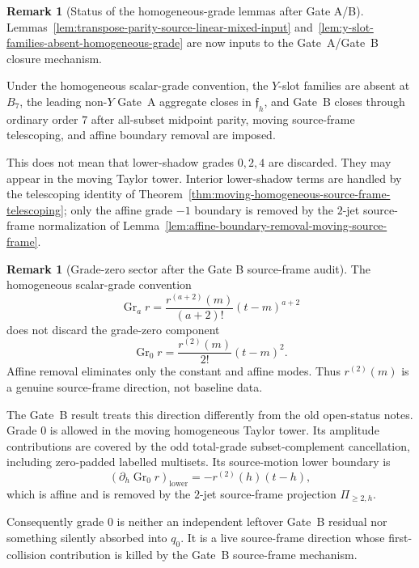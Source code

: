 \documentclass[11pt,a4paper]{amsart}
\theoremstyle{plain}
\theoremstyle{definition}
\newtheorem{remark}[theorem]{Remark}
\begin{document}
\begin{remark}[Status of the homogeneous-grade lemmas after Gate A/B]
\label{rem:status-homogeneous-grade-lemmas}
Lemmas~\ref{lem:transpose-parity-source-linear-mixed-input}
and~\ref{lem:y-slot-families-absent-homogeneous-grade} are now inputs to
the Gate~A/Gate~B closure mechanism.

Under the homogeneous scalar-grade convention, the \(Y\)-slot families are
absent at \(B_7\), the leading non-\(Y\) Gate~A aggregate closes in
\(\mathfrak f_h\), and Gate~B closes through ordinary order \(7\) after
all-subset midpoint parity, moving source-frame telescoping, and affine
boundary removal are imposed.

This does not mean that lower-shadow grades \(0,2,4\) are discarded.  They
may appear in the moving Taylor tower.  Interior lower-shadow terms are
handled by the telescoping identity of
Theorem~\ref{thm:moving-homogeneous-source-frame-telescoping}; only the
affine grade \(-1\) boundary is removed by the \(2\)-jet source-frame
normalization of
Lemma~\ref{lem:affine-boundary-removal-moving-source-frame}.
\end{remark}

\begin{remark}[Grade-zero sector after the Gate B source-frame audit]
\label{rem:grade-zero-sector-after-gate-b-source-frame-audit}
The homogeneous scalar-grade convention
\[
\operatorname{Gr}_a r
=
\frac{r^{(a+2)}(m)}{(a+2)!}(t-m)^{a+2}
\]
does not discard the grade-zero component
\[
\operatorname{Gr}_0r=\frac{r^{(2)}(m)}{2!}(t-m)^2.
\]
Affine removal eliminates only the constant and affine modes.  Thus
\(r^{(2)}(m)\) is a genuine source-frame direction, not baseline data.

The Gate~B result treats this direction differently from the old
open-status notes.  Grade \(0\) is allowed in the moving homogeneous Taylor
tower.  Its amplitude contributions are covered by the odd total-grade
subset-complement cancellation, including zero-padded labelled multisets.
Its source-motion lower boundary is
\[
(\partial_h\operatorname{Gr}_{0}r)_{\mathrm{lower}}
=
-r^{(2)}(h)(t-h),
\]
which is affine and is removed by the \(2\)-jet source-frame projection
\(\Pi_{\ge2,h}\).

Consequently grade \(0\) is neither an independent leftover Gate~B residual
nor something silently absorbed into \(q_0\).  It is a live source-frame
direction whose first-collision contribution is killed by the Gate~B
source-frame mechanism.
\end{remark}
\end{document}
